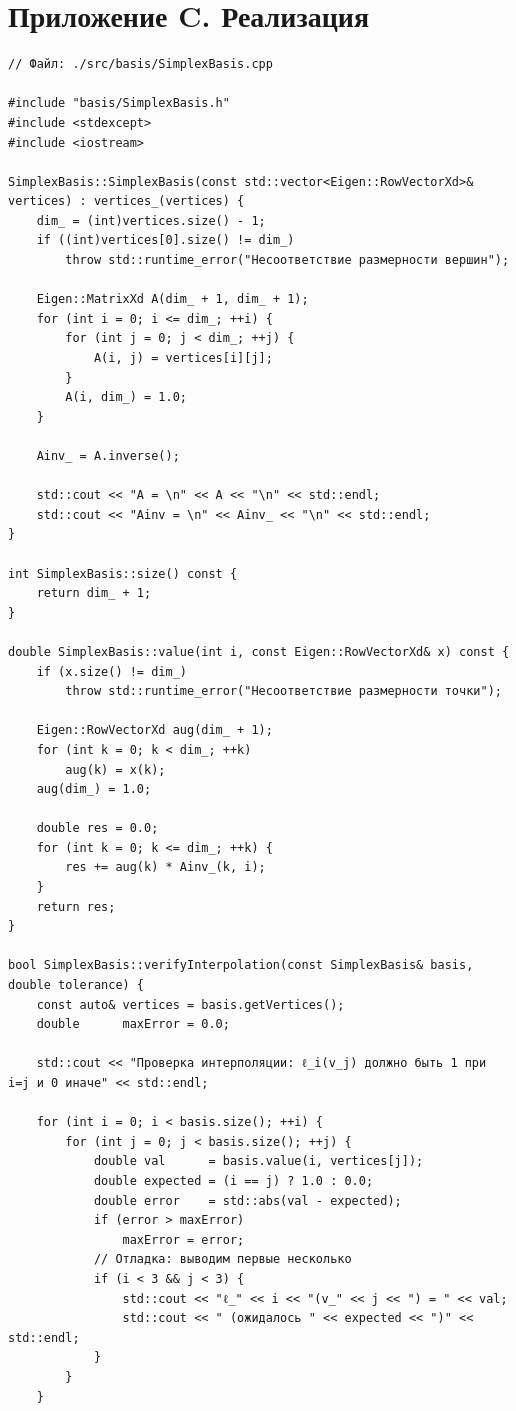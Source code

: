 \documentclass[a4paper,12pt]{article}
\begin{document}
\setcounter{page}{29}
\section*{Приложение C. Реализация}
\begin{lstlisting}
// Файл: ./src/basis/SimplexBasis.cpp

#include "basis/SimplexBasis.h"
#include <stdexcept>
#include <iostream>

SimplexBasis::SimplexBasis(const std::vector<Eigen::RowVectorXd>& vertices) : vertices_(vertices) {
    dim_ = (int)vertices.size() - 1;
    if ((int)vertices[0].size() != dim_)
        throw std::runtime_error("Несоответствие размерности вершин");

    Eigen::MatrixXd A(dim_ + 1, dim_ + 1);
    for (int i = 0; i <= dim_; ++i) {
        for (int j = 0; j < dim_; ++j) {
            A(i, j) = vertices[i][j];
        }
        A(i, dim_) = 1.0;
    }

    Ainv_ = A.inverse();

    std::cout << "A = \n" << A << "\n" << std::endl;
    std::cout << "Ainv = \n" << Ainv_ << "\n" << std::endl;
}

int SimplexBasis::size() const {
    return dim_ + 1;
}

double SimplexBasis::value(int i, const Eigen::RowVectorXd& x) const {
    if (x.size() != dim_)
        throw std::runtime_error("Несоответствие размерности точки");

    Eigen::RowVectorXd aug(dim_ + 1);
    for (int k = 0; k < dim_; ++k)
        aug(k) = x(k);
    aug(dim_) = 1.0;

    double res = 0.0;
    for (int k = 0; k <= dim_; ++k) {
        res += aug(k) * Ainv_(k, i);
    }
    return res;
}

bool SimplexBasis::verifyInterpolation(const SimplexBasis& basis, double tolerance) {
    const auto& vertices = basis.getVertices();
    double      maxError = 0.0;

    std::cout << "Проверка интерполяции: ℓ_i(v_j) должно быть 1 при i=j и 0 иначе" << std::endl;

    for (int i = 0; i < basis.size(); ++i) {
        for (int j = 0; j < basis.size(); ++j) {
            double val      = basis.value(i, vertices[j]);
            double expected = (i == j) ? 1.0 : 0.0;
            double error    = std::abs(val - expected);
            if (error > maxError)
                maxError = error;
            // Отладка: выводим первые несколько
            if (i < 3 && j < 3) {
                std::cout << "ℓ_" << i << "(v_" << j << ") = " << val;
                std::cout << " (ожидалось " << expected << ")" << std::endl;
            }
        }
    }


\end{lstlisting}
\end{document}
